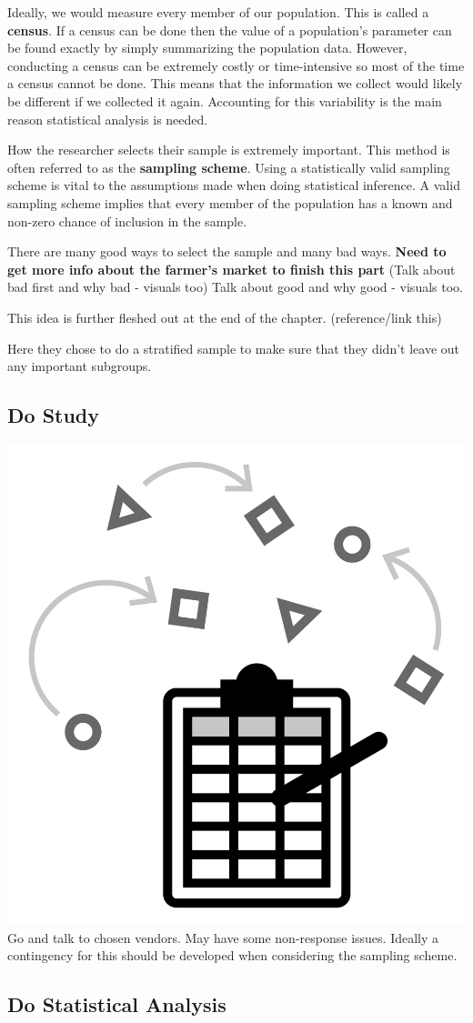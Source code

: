\documentclass[
]{book}
\theoremstyle{definition}
\theoremstyle{definition}
\theoremstyle{definition}
\theoremstyle{remark}
\begin{document}
Ideally, we would measure every member of our population. This is called a \textbf{census}. If a census can be done then the value of a population's parameter can be found exactly by simply summarizing the population data. However, conducting a census can be extremely costly or time-intensive so most of the time a census cannot be done. This means that the information we collect would likely be different if we collected it again. Accounting for this variability is the main reason statistical analysis is needed.

How the researcher selects their sample is extremely important. This method is often referred to as the \textbf{sampling scheme}. Using a statistically valid sampling scheme is vital to the assumptions made when doing statistical inference. A valid sampling scheme implies that every member of the population has a known and non-zero chance of inclusion in the sample.

There are many good ways to select the sample and many bad ways. \textbf{Need to get more info about the farmer's market to finish this part}
(Talk about bad first and why bad - visuals too) Talk about good and why good - visuals too.

This idea is further fleshed out at the end of the chapter. (reference/link this)

Here they chose to do a stratified sample to make sure that they didn't leave out any important subgroups.

\hypertarget{do-study}{%
\subsection{Do Study}\label{do-study}}

\includegraphics[width=0.13\linewidth,style="float:left; padding:10px"]{img/conductStudy}
Go and talk to chosen vendors. May have some non-response issues. Ideally a contingency for this should be developed when considering the sampling scheme.

\hypertarget{do-statistical-analysis}{%
\subsection{Do Statistical Analysis}\label{do-statistical-analysis}}
\end{document}
